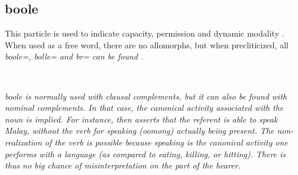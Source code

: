 %




\subsection{boole}\label{sec:wc:boole}
This particle is used to indicate capacity, permission and dynamic modality \citep[174]{SmithEtAl2007}. When used as a free word, there are no allomorphs, but when precliticized, all \em boole=, bolle= \em and \em b\E r= \em can be found \citep[cf.][139]{Slomanson2007cll}.


\\




\em boole \em is normally used with clausal complements, but it can also be found with nominal complements. In that case, the canonical activity associated with the noun is implied. For instance,  then asserts that the referent is able to speak Malay, without the verb for speaking (\em oomong\em) actually being present. The non-realization of the verb is possible because speaking is the canonical activity one performs with a language (as compared to eating, killing, or hitting). There is thus no big chance of misinterpretation on the part of the hearer.


\\


\\


